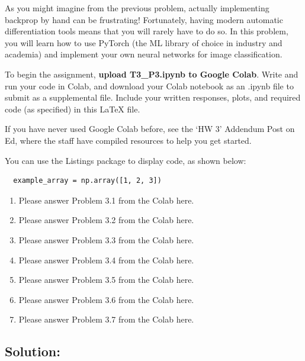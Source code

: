 \documentclass[submit]{harvardml}
\begin{document}
\newpage


\begin{problem}

  As you might imagine from the previous problem, actually implementing
  backprop by hand can be frustrating!  Fortunately, having modern
  automatic differentiation tools means that you will rarely have to do
  so.  In this problem, you will learn how to use PyTorch (the ML library of choice in industry and academia) and implement your own neural networks for image classification.
  
  To begin the assignment, \textbf{upload T3\_P3.ipynb to Google Colab}.  Write and run your code in Colab, and download your Colab notebook as an .ipynb file to submit as a supplemental file. Include your written responses, plots, and required code (as specified) in this LaTeX file.  
  
  If you have never used Google Colab before, see the `HW 3' Addendum Post on Ed, where the staff have compiled resources to help you get started. 
  
  You can use the Listings package to display code, as shown below:
  
  \begin{lstlisting}
  example_array = np.array([1, 2, 3])
  \end{lstlisting}
  
  \begin{enumerate}
      \item Please answer Problem 3.1 from the Colab here.
      \item Please answer Problem 3.2 from the Colab here.
      \item Please answer Problem 3.3 from the Colab here.
      \item Please answer Problem 3.4 from the Colab here.
      \item Please answer Problem 3.5 from the Colab here.
      \item Please answer Problem 3.6 from the Colab here.
      \item Please answer Problem 3.7 from the Colab here.
  \end{enumerate}
  
\end{problem}


\subsection*{Solution:}
\end{document}
